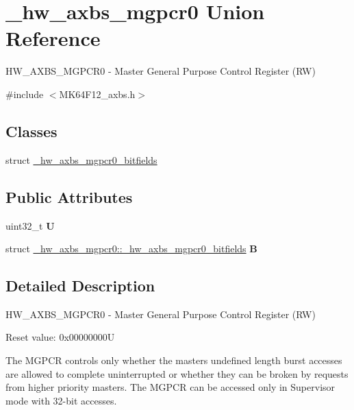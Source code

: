 \hypertarget{union__hw__axbs__mgpcr0}{}\section{\+\_\+hw\+\_\+axbs\+\_\+mgpcr0 Union Reference}
\label{union__hw__axbs__mgpcr0}


H\+W\+\_\+\+A\+X\+B\+S\+\_\+\+M\+G\+P\+C\+R0 -\/ Master General Purpose Control Register (RW)  




{\ttfamily \#include $<$M\+K64\+F12\+\_\+axbs.\+h$>$}

\subsection*{Classes}
\begin{DoxyCompactItemize}
\item 
struct \hyperlink{struct__hw__axbs__mgpcr0_1_1__hw__axbs__mgpcr0__bitfields}{\+\_\+hw\+\_\+axbs\+\_\+mgpcr0\+\_\+bitfields}
\end{DoxyCompactItemize}
\subsection*{Public Attributes}
\begin{DoxyCompactItemize}
\item 
uint32\+\_\+t {\bfseries U}\hypertarget{union__hw__axbs__mgpcr0_a42966df4ab4026277ddfcd1210926790}{}\label{union__hw__axbs__mgpcr0_a42966df4ab4026277ddfcd1210926790}

\item 
struct \hyperlink{struct__hw__axbs__mgpcr0_1_1__hw__axbs__mgpcr0__bitfields}{\+\_\+hw\+\_\+axbs\+\_\+mgpcr0\+::\+\_\+hw\+\_\+axbs\+\_\+mgpcr0\+\_\+bitfields} {\bfseries B}\hypertarget{union__hw__axbs__mgpcr0_a747586db56815ddecf5b65cb895d39cc}{}\label{union__hw__axbs__mgpcr0_a747586db56815ddecf5b65cb895d39cc}

\end{DoxyCompactItemize}


\subsection{Detailed Description}
H\+W\+\_\+\+A\+X\+B\+S\+\_\+\+M\+G\+P\+C\+R0 -\/ Master General Purpose Control Register (RW) 

Reset value\+: 0x00000000U

The M\+G\+P\+CR controls only whether the master\textquotesingle{}s undefined length burst accesses are allowed to complete uninterrupted or whether they can be broken by requests from higher priority masters. The M\+G\+P\+CR can be accessed only in Supervisor mode with 32-\/bit accesses. 

